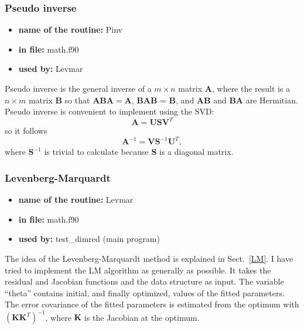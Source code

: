 \documentclass[12pt,a4paper]{article}
\newcommand{\mat}[1]{\mathbf{#1}}
\begin{document}
\subsubsection{Pseudo inverse}
\begin{itemize}
 \item \textbf{name of the routine:} Pinv
 \item \textbf{in file:} math.f90
 \item \textbf{used by:} Levmar
\end{itemize}
Pseudo inverse is the general inverse of a $m \times n$ matrix $\mat{A}$, where the
result is a $n \times m$ matrix $\mat{B}$ so that 
$\mat{ABA} = \mat{A}$, $\mat{BAB}$ = $\mat{B}$, and $\mat{AB}$ and $\mat{BA}$
are Hermitian. Pseudo inverse is convenient to implement using the SVD:
\begin{equation}
\mat{A}=\mat{U}\mat{S}\mat{V}^T
\end{equation} 
so it follows 
\begin{equation}
\mat{A}^{-1}=\mat{V}\mat{S}^{-1}\mat{U}^T,
\end{equation} 
where $\mat{S}^{-1}$ is trivial to calculate because $\mat{S}$ is a diagonal matrix.

\subsubsection{Levenberg-Marquardt}
\begin{itemize}
 \item \textbf{name of the routine:} Levmar
 \item \textbf{in file:} math.f90
 \item \textbf{used by:} test\_dimred (main program)
\end{itemize}
The idea of the Levenberg-Marquardt method is explained in Sect.~\ref{LM}. I have tried to implement the LM algorithm as generally as possible. 
It takes the residual and Jacobian functions and the data structure as input. The variable ``theta'' contains initial, and finally optimized, values
of the fitted parameters. The error covariance of the fitted parameters is estimated from the optimum with $(\mat{K}\mat{K}^T)^{-1}$, where
$\mat{K}$ is the Jacobian at the optimum.
\end{document}
